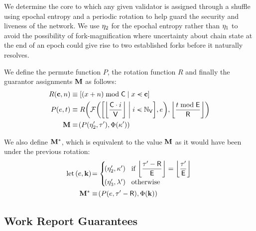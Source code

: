 We determine the core to which any given validator is assigned through a shuffle using epochal entropy and a periodic rotation to help guard the security and liveness of the network. We use $\eta_2$ for the epochal entropy rather than $\eta_1$ to avoid the possibility of fork-magnification where uncertainty about chain state at the end of an epoch could give rise to two established forks before it naturally resolves.

We define the permute function $P$, the rotation function $R$ and finally the guarantor assignments  $\mathbf{M}$ as follows:
\begin{align}
  R(\mathbf{c}, n) &\equiv \sq{\build{(x + n) \bmod \Ccorecount}{x \orderedin \mathbf{c}}}\\
  P(e, t) &\equiv R\left(
    \fyshuffle{\sq{\build{\ffrac{\Ccorecount \cdot i}{\Cvalcount}}{i \orderedin \valindex}}, e},
    \ffrac{t \bmod \Cepochlen}{\Crotationperiod}
  \right)\\
  \guarantorassignments &\equiv \tup{P(\entropy'_2, \thetime'), \Phi(\activeset')}
\end{align}

We also define $\mathbf{M}^*$, which is equivalent to the value $\mathbf{M}$ as it would have been under the previous rotation:
\begin{equation}
  \label{eq:priorassignments}
  \begin{aligned}
    \using \tup{e, \mathbf{k}} &= \begin{cases}
      \tup{\entropy'_2, \activeset'} &\when \displaystyle\ffrac{\thetime' - \Crotationperiod}{\Cepochlen} = \ffrac{\thetime'}{\Cepochlen}\\
      \tup{\entropy'_3, \previousset'} &\otherwise
    \end{cases} \\
    \guarantorassignmentsunderlastrotation &\equiv \tup{
      P(e, \thetime' - \Crotationperiod),
      \Phi(\mathbf{k})
    }
  \end{aligned}
\end{equation}














\subsection{Work Report Guarantees}\label{sec:workreportguarantees}

